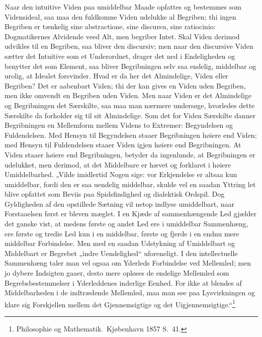 \documentclass[12pt]{book}
\newcommand{\opage}[1]{\marginnote{\footnotesize\textit{[#1]}}}
\begin{document}
Naar den intuitive Viden paa umiddelbar Maade opfattes og bestemmes som Vidensideal, saa maa den
fuldkomne Viden udelukke al Begriben; thi ingen Begriben er tænkelig sine abstractione, sine
discursu, sine ratiocinio: Dogmatikernes Alvidende veed Alt, men begriber Intet. Skal Viden derimod
udvikles til en Begriben, saa bliver den discursiv; men naar den discursive Viden sætter det
Intuitive som et Underordnet, drager det ned i Endeligheden og benytter det som Element, saa bliver
Begribningen selv saa endelig, middelbar og urolig, at Idealet forsvinder. Hvad er da her det
Almindelige, Viden eller Begriben? Det er aabenbart Viden; thi der kan gives en Viden uden Begriben,
men ikke omvendt en Begriben uden Viden. Men naar Viden er det Almindelige og Begribningen det
Særskilte, saa maa man nærmere undersøge, hvorledes dette Særskilte da forholder sig til sit
Almindelige. Som det for Viden Særskilte danner Begribningen en Mellemform mellem Videns to
Extremer: Begyndelsen og Fuldendelsen. Med Hensyn til Begyndelsen staaer Begribningen høiere end
Viden; med Hensyn til Fuldendelsen staaer Viden igjen høiere end Begribningen. At Viden staaer
høiere end Begribningen, betyder da ingenlunde, at Begribningen er udelukket, men derimod, at det
Middelbare er hævet og forklaret i høiere Umiddelbarhed. „Vilde imidlertid Nogen
\opage{254} sige: vor Erkjendelse er altsaa kun umiddelbar, fordi den er saa uendelig middelbar, skulde vel en
saadan Yttring let blive opfattet som Beviis paa Spidsfindighed og dialektisk Ordspil. Dog
Gyldigheden af den opstillede Sætning vil netop indlyse umiddelbart, naar Forstaaelsen først er
bleven mæglet. I en Kjæde af sammenhængende Led gjælder det ganske vist, at medens første og andet
Led ere i umiddelbar Sammenhæng, ere første og tredie Led kun i en middelbar, første og fjerde i en
endnu mere middelbar Forbindelse. Men med en saadan Udstykning af Umiddelbart og Middelbart er
Begrebet „indre Uendelighed“ uforeneligt. I den intellectuelle Sammenhæng taler man vel ogsaa om
Yderleds Forbindelse ved Mellemled; men jo dybere Indsigten gaaer, desto mere opløses de endelige
Mellemled som Begrebsbestemmelser i Yderleddenes inderlige Eenhed. For ikke at blendes af
Middelbarheden i de indtrædende Mellemled, maa man see paa Lysvirkningen og klare sig Forskjellen
mellem det Gjennemsigtige og det Uigjennemsigtige.“\footnote{Philosophie og Mathematik.\ Kjøbenhavn
1857 S.~41.}
\end{document}
